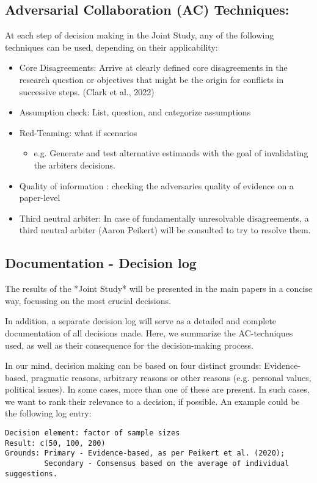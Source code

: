 \documentclass[man]{apa7}
\begin{document}
\subsection{Adversarial Collaboration (AC) Techniques:}
At each step of decision making in the Joint Study, any of the following techniques can be used, depending on their applicability:
\begin{itemize}
    \item Core Disagreements: Arrive at clearly defined core disagreements in the research question or objectives that might be the origin for conflicts in successive steps. (Clark et al., 2022)
    \item Assumption check: List, question, and categorize assumptions \parencite{kardos_simple_2017}
    \item Red-Teaming: what if scenarios \parencite{kardos_simple_2017}
    \begin{itemize}
        \item e.g. Generate and test alternative estimands with the goal of invalidating the arbiters decisions.
    \end{itemize}
    \item Quality of information \parencite{kardos_simple_2017}: checking the adversaries quality of evidence on a paper-level
    \item Third neutral arbiter: In case of fundamentally unresolvable disagreements, a third neutral arbiter (Aaron Peikert) will be consulted to try to resolve them.
\end{itemize}
\subsection{Documentation - Decision log}
The results of the *Joint Study* will be presented in the main papers in a concise way, focussing on the most crucial decisions.

In addition, a separate decision log will serve as a detailed and complete documentation of all decisions made. Here, we summarize the AC-techniques used, as well as their consequence for the decision-making process.

In our mind, decision making can be based on four distinct grounds: Evidence-based, pragmatic reasons, arbitrary reasons or other reasons (e.g. personal values, political issues). In some cases, more than one of these are present. In such cases, we want to rank their relevance to a decision, if possible. An example could be the following log entry: 
\begin{verbatim}
Decision element: factor of sample sizes
Result: c(50, 100, 200)
Grounds: Primary - Evidence-based, as per Peikert et al. (2020); 
         Secondary - Consensus based on the average of individual suggestions.
\end{verbatim}
\end{document}
